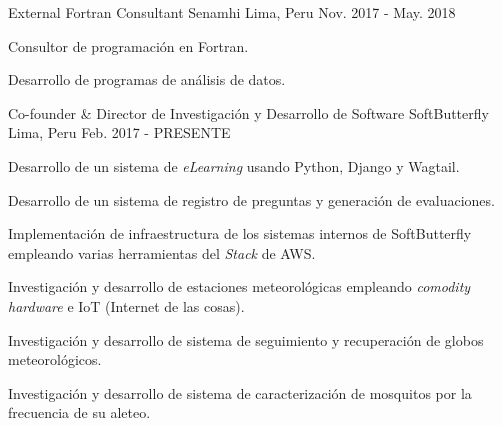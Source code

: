 

\begin{cventries}

  \cventry
    {External Fortran Consultant} %
    {Senamhi} %
    {Lima, Peru} %
    {Nov. 2017 - May. 2018} %
    {
      \begin{cvitems} %
        \item {Consultor de programación en Fortran.}
        \item {Desarrollo de programas de análisis de datos.}
      \end{cvitems}
    }

  \cventry
    {Co-founder \& Director de Investigación y Desarrollo de Software} %
    {SoftButterfly} %
    {Lima, Peru} %
    {Feb. 2017 - PRESENTE} %
    {
      \begin{cvitems} %
        \item {Desarrollo de un sistema de \textit{eLearning} usando Python, Django y Wagtail.}
        \item {Desarrollo de un sistema de registro de preguntas y generación
        de evaluaciones.}
        \item {Implementación de infraestructura de los sistemas internos de
        SoftButterfly empleando varias herramientas del \textit{Stack} de AWS.}
        \item {Investigación y desarrollo de estaciones meteorológicas empleando
        \textit{comodity hardware} e IoT (Internet de las cosas).}
        \item {Investigación y desarrollo de sistema de seguimiento y
        recuperación de globos meteorológicos.}
        \item {Investigación y desarrollo de sistema de caracterización de
        mosquitos por la frecuencia de su aleteo.}
      \end{cvitems}
    }


\end{cventries}
